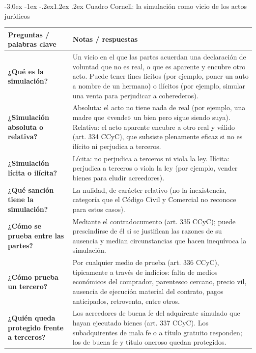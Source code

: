 \documentclass[12pt,oneside]{book}
\makeatletter
\renewcommand\section{\@startsection{section}{1}{\z@}%
  {-3.0ex \@plus -1ex \@minus -.2ex}{1.2ex \@plus .2ex}%
  {\normalfont\large\bfseries\color{acento}}}
\makeatother
\begin{document}
\section{Cuadro Cornell: la simulación como vicio de los actos jurídicos}
\begin{longtable}{@{}     >{\raggedright\arraybackslash}p{}     >{\raggedright\arraybackslash}p{} @{}}
\toprule
\textbf{Preguntas / palabras clave} &
\textbf{Notas / respuestas} \\
\midrule

\textbf{¿Qué es la simulación?} &
Un vicio en el que las partes acuerdan una declaración de voluntad que no es real, o que es aparente y encubre otro acto. Puede tener fines lícitos (por ejemplo, poner un auto a nombre de un hermano) o ilícitos (por ejemplo, simular una venta para perjudicar a coherederos). \\

\textbf{¿Simulación absoluta o relativa?} &
Absoluta: el acto no tiene nada de real (por ejemplo, una madre que «vende» un bien pero sigue siendo suya). Relativa: el acto aparente encubre a otro real y válido (art. 334 CCyC), que subsiste plenamente eficaz si no es ilícito ni perjudica a terceros. \\

\textbf{¿Simulación lícita o ilícita?} &
Lícita: no perjudica a terceros ni viola la ley. Ilícita: perjudica a terceros o viola la ley (por ejemplo, vender bienes para eludir acreedores). \\

\textbf{¿Qué sanción tiene la simulación?} &
La nulidad, de carácter relativo (no la inexistencia, categoría que el Código Civil y Comercial no reconoce para estos casos). \\

\textbf{¿Cómo se prueba entre las partes?} &
Mediante el contradocumento (art. 335 CCyC); puede prescindirse de él si se justifican las razones de su ausencia y median circunstancias que hacen inequívoca la simulación. \\

\textbf{¿Cómo prueba un tercero?} &
Por cualquier medio de prueba (art. 336 CCyC), típicamente a través de indicios: falta de medios económicos del comprador, parentesco cercano, precio vil, ausencia de ejecución material del contrato, pagos anticipados, retroventa, entre otros. \\

\textbf{¿Quién queda protegido frente a terceros?} &
Los acreedores de buena fe del adquirente simulado que hayan ejecutado bienes (art. 337 CCyC). Los subadquirentes de mala fe o a título gratuito responden; los de buena fe y título oneroso quedan protegidos. \\


\end{longtable}
\end{document}
